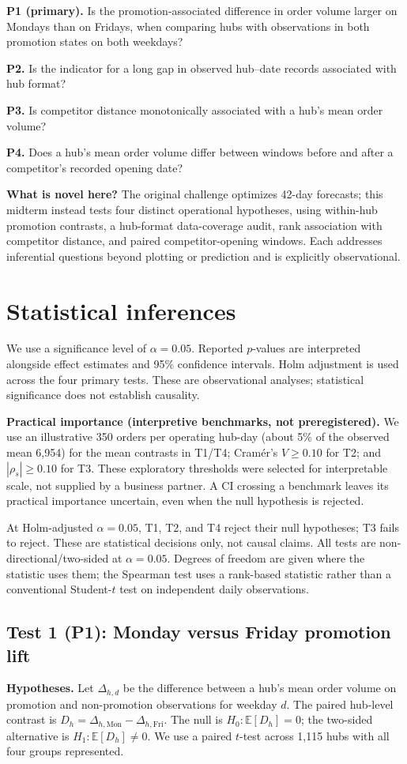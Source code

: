 \documentclass[10pt,a4paper,twocolumn]{article}
\begin{document}
\textbf{P1 (primary).} Is the promotion-associated difference in order volume larger on Mondays than on Fridays, when comparing hubs with observations in both promotion states on both weekdays?

\textbf{P2.} Is the indicator for a long gap in observed hub--date records associated with hub format?

\textbf{P3.} Is competitor distance monotonically associated with a hub's mean order volume?

\textbf{P4.} Does a hub's mean order volume differ between windows before and after a competitor's recorded opening date?

\textbf{What is novel here?} The original challenge optimizes 42-day forecasts; this midterm instead tests four distinct operational hypotheses, using within-hub promotion contrasts, a hub-format data-coverage audit, rank association with competitor distance, and paired competitor-opening windows. Each addresses inferential questions beyond plotting or prediction and is explicitly observational.

\section{Statistical inferences}
We use a significance level of $\alpha=0.05$. Reported $p$-values are interpreted alongside effect estimates and 95\% confidence intervals. Holm adjustment is used across the four primary tests. These are observational analyses; statistical significance does not establish causality.

\textbf{Practical importance (interpretive benchmarks, not preregistered).}
We use an illustrative 350 orders per operating hub-day (about 5\% of the observed mean 6,954) for the mean contrasts in T1/T4; Cram\'er's $V\ge0.10$ for T2; and $|\rho_s|\ge0.10$ for T3. These exploratory thresholds were selected for interpretable scale, not supplied by a business partner. A CI crossing a benchmark leaves its practical importance uncertain, even when the null hypothesis is rejected.

At Holm-adjusted $\alpha=0.05$, T1, T2, and T4 reject their null hypotheses; T3 fails to reject. These are statistical decisions only, not causal claims. All tests are non-directional/two-sided at $\alpha=0.05$. Degrees of freedom are given where the statistic uses them; the Spearman test uses a rank-based statistic rather than a conventional Student-$t$ test on independent daily observations.

\subsection{Test 1 (P1): Monday versus Friday promotion lift}
\textbf{Hypotheses.} Let $\Delta_{h,d}$ be the difference between a hub's mean order volume on promotion and non-promotion observations for weekday $d$. The paired hub-level contrast is $D_h=\Delta_{h,\mathrm{Mon}}-\Delta_{h,\mathrm{Fri}}$. The null is $H_0:\mathbb{E}[D_h]=0$; the two-sided alternative is $H_1:\mathbb{E}[D_h]\ne0$. We use a paired $t$-test across 1,115 hubs with all four groups represented.
\end{document}
